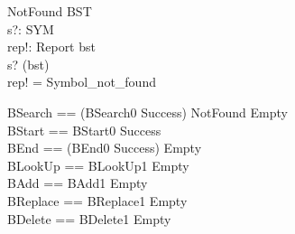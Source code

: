 \begin{schema}{NotFound}
  \Xi BST \\
  s?: SYM \\
  rep!: Report
\where
  bst \neq \langle\rangle \\
  s? \notin \dom(\distro bst) \\
  rep! = Symbol\_not\_found
\end{schema}

\begin{zed}
  BSearch == (BSearch0 \land Success) \lor NotFound \lor Empty \\
  BStart == BStart0 \land Success \\
  BEnd == (BEnd0 \land Success) \lor Empty \\
  BLookUp == BLookUp1 \lor Empty \\
  BAdd == BAdd1 \lor Empty \\
  BReplace == BReplace1 \lor Empty \\
  BDelete == BDelete1 \lor Empty
\end{zed}
